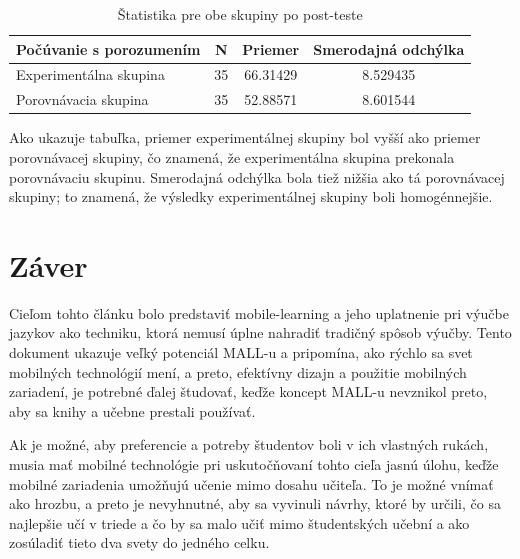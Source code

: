 \documentclass[10pt,oneside,slovak,a4paper]{article}
\begin{document}


\begin{table}[tbh]
\centering
\begin{tabular}{@{}|l|c|c|c|@{}}
\toprule
Počúvanie s porozumením & N  & Priemer  & Smerodajná odchýlka \\ \midrule
Experimentálna skupina  & 35 & 66.31429 & 8.529435            \\ \midrule
Porovnávacia skupina    & 35 & 52.88571 & 8.601544            \\ \bottomrule
\end{tabular}
\caption{\label{tab:Štatistika}Štatistika pre obe skupiny po post-teste}
\end{table}

Ako ukazuje tabuľka, priemer experimentálnej skupiny bol vyšší ako priemer porovnávacej skupiny, čo znamená, že experimentálna skupina prekonala porovnávaciu skupinu. Smerodajná odchýlka bola tiež nižšia ako tá porovnávacej skupiny; to znamená, že výsledky experimentálnej skupiny boli homogénnejšie.



\section{Záver} \label{zaver} %

Cieľom tohto článku bolo predstaviť mobile-learning a jeho uplatnenie pri výučbe jazykov ako techniku, ktorá nemusí úplne nahradiť tradičný spôsob výučby. Tento dokument ukazuje veľký potenciál MALL-u a pripomína, ako rýchlo sa svet mobilných technológií mení, a preto, efektívny dizajn a použitie mobilných zariadení, je potrebné ďalej študovať, keďže koncept MALL-u nevznikol preto, aby sa knihy a učebne prestali používať\cite{Kim2012}.

Ak je možné, aby preferencie a potreby študentov boli v ich vlastných rukách, musia mať mobilné technológie pri uskutočňovaní tohto cieľa jasnú úlohu, keďže mobilné zariadenia umožňujú učenie mimo dosahu učiteľa\cite{KukulskaHulme2009}. To je možné vnímať ako hrozbu, a preto je nevyhnutné, aby sa vyvinuli návrhy, ktoré by určili, čo sa najlepšie učí v triede a čo by sa malo učiť mimo študentských učební a ako zosúladiť tieto dva svety do jedného celku.




\end{document}
